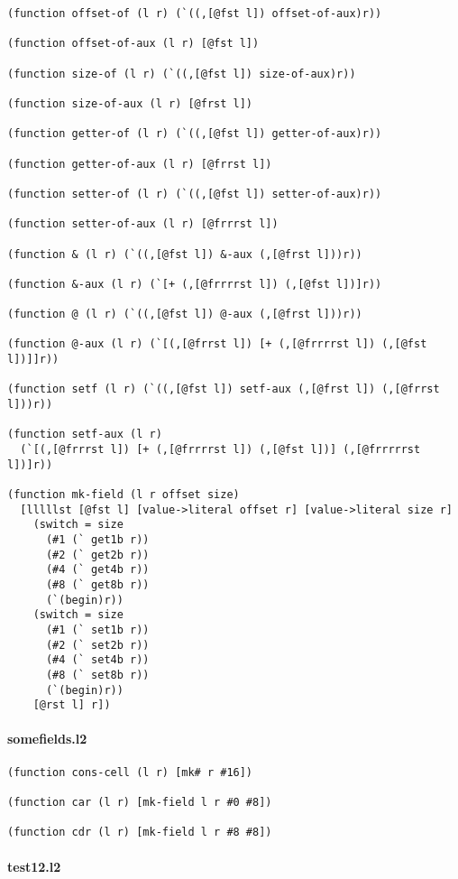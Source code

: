 \documentclass[]{article}
\let\oldparagraph\paragraph
\renewcommand{\paragraph}[1]{\oldparagraph{#1}\mbox{}}
\begin{document}
\begin{verbatim}
(function offset-of (l r) (`((,[@fst l]) offset-of-aux)r))

(function offset-of-aux (l r) [@fst l])

(function size-of (l r) (`((,[@fst l]) size-of-aux)r))

(function size-of-aux (l r) [@frst l])

(function getter-of (l r) (`((,[@fst l]) getter-of-aux)r))

(function getter-of-aux (l r) [@frrst l])

(function setter-of (l r) (`((,[@fst l]) setter-of-aux)r))

(function setter-of-aux (l r) [@frrrst l])

(function & (l r) (`((,[@fst l]) &-aux (,[@frst l]))r))

(function &-aux (l r) (`[+ (,[@frrrrst l]) (,[@fst l])]r))

(function @ (l r) (`((,[@fst l]) @-aux (,[@frst l]))r))

(function @-aux (l r) (`[(,[@frrst l]) [+ (,[@frrrrst l]) (,[@fst l])]]r))

(function setf (l r) (`((,[@fst l]) setf-aux (,[@frst l]) (,[@frrst l]))r))

(function setf-aux (l r)
  (`[(,[@frrrst l]) [+ (,[@frrrrst l]) (,[@fst l])] (,[@frrrrrst l])]r))

(function mk-field (l r offset size)
  [lllllst [@fst l] [value->literal offset r] [value->literal size r]
    (switch = size
      (#1 (` get1b r))
      (#2 (` get2b r))
      (#4 (` get4b r))
      (#8 (` get8b r))
      (`(begin)r))
    (switch = size
      (#1 (` set1b r))
      (#2 (` set2b r))
      (#4 (` set4b r))
      (#8 (` set8b r))
      (`(begin)r))
    [@rst l] r])
\end{verbatim}

\paragraph{somefields.l2}\label{somefields.l2}

\begin{verbatim}
(function cons-cell (l r) [mk# r #16])

(function car (l r) [mk-field l r #0 #8])

(function cdr (l r) [mk-field l r #8 #8])
\end{verbatim}

\paragraph{test12.l2}\label{test12.l2}
\end{document}
